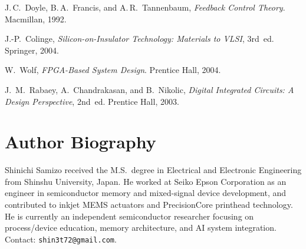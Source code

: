 \documentclass[conference]{IEEEtran}
\begin{document}
\begin{thebibliography}{99}
J.\,C.~Doyle, B.\,A.~Francis, and A.\,R.~Tannenbaum,
\emph{Feedback Control Theory}. Macmillan, 1992.

J.-P.~Colinge, \emph{Silicon-on-Insulator Technology: Materials to VLSI}, 3rd~ed. Springer, 2004.

W.~Wolf, \emph{FPGA-Based System Design}. Prentice Hall, 2004.

J.~M.~Rabaey, A.~Chandrakasan, and B.~Nikolic,
\emph{Digital Integrated Circuits: A Design Perspective}, 2nd~ed. Prentice Hall, 2003.
\end{thebibliography}

\section*{Author Biography}
Shinichi Samizo received the M.S.\ degree in Electrical and Electronic Engineering from Shinshu University, Japan. He worked at Seiko Epson Corporation as an engineer in semiconductor memory and mixed-signal device development, and contributed to inkjet MEMS actuators and PrecisionCore printhead technology. He is currently an independent semiconductor researcher focusing on process/device education, memory architecture, and AI system integration. Contact: \texttt{shin3t72@gmail.com}.
\end{document}
